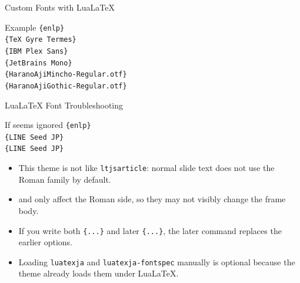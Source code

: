 \documentclass[10pt]{beamer}
\begin{document}
\begin{frame}{Custom Fonts with LuaLaTeX}
\begin{block}{Example}
\small
\texttt{\string\usetheme\{enlp\}}\\
\texttt{\string\setmainfont\{TeX Gyre Termes\}}\\
\texttt{\string\setsansfont\{IBM Plex Sans\}}\\
\texttt{\string\setmonofont\{JetBrains Mono\}}\\
\texttt{\string\setmainjfont[BoldFont=HaranoAjiMincho-Bold.otf]\{HaranoAjiMincho-Regular.otf\}}\\
\texttt{\string\setsansjfont[BoldFont=HaranoAjiGothic-Bold.otf]\{HaranoAjiGothic-Regular.otf\}}
\end{block}
\end{frame}

\begin{frame}{LuaLaTeX Font Troubleshooting}
\begin{block}{If \texttt{\string\setmainfont} seems ignored}
\small
\texttt{\string\usetheme\{enlp\}}\\
\texttt{\string\setsansfont[BoldFont=*Bold,FakeBold=2.5]\{LINE Seed JP\}}\\
\texttt{\string\setsansjfont[BoldFont=*Bold,FakeBold=2.5]\{LINE Seed JP\}}
\end{block}
  \begin{itemize}
    \item This theme is not like \texttt{ltjsarticle}: normal slide text does not use the Roman family by default.
    \item \texttt{\string\setmainfont} and \texttt{\string\setmainjfont} only affect the Roman side, so they may not visibly change the frame body.
    \item If you write both \texttt{\string\setmainfont[\ldots]\{...\}} and later \texttt{\string\setmainfont\{...\}}, the later command replaces the earlier options.
    \item Loading \texttt{luatexja} and \texttt{luatexja-fontspec} manually is optional because the theme already loads them under LuaLaTeX.
  \end{itemize}
\end{frame}
\end{document}
